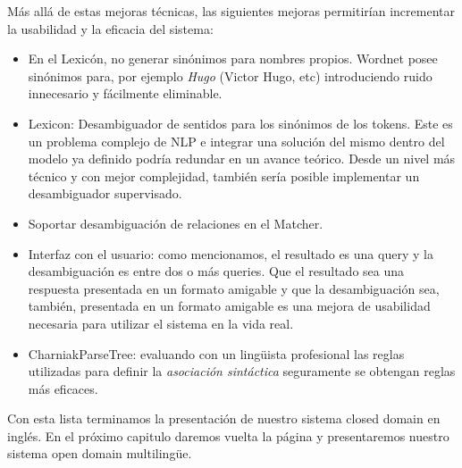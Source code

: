 Más allá de estas mejoras técnicas, las siguientes mejoras permitirían incrementar la usabilidad y la eficacia del sistema:

\begin{itemize}
\item En el Lexicón, no generar sinónimos para nombres propios. Wordnet posee sinónimos para, por ejemplo \textit{Hugo} (Victor Hugo, etc) introduciendo ruido innecesario y fácilmente eliminable.
\item Lexicon: Desambiguador de sentidos para los sinónimos de los tokens. Este es un problema complejo de NLP e integrar una solución del mismo dentro del modelo ya definido podría redundar en un avance teórico. Desde un nivel más técnico y con mejor complejidad, también sería posible implementar un desambiguador supervisado.
\item Soportar desambiguación de relaciones en el Matcher.
\item Interfaz con el usuario: como mencionamos, el resultado es una query y la desambiguación es entre dos o más queries. Que el resultado sea una respuesta presentada en un formato amigable y que la desambiguación sea, también, presentada en un formato amigable es una mejora de usabilidad necesaria para utilizar el sistema en la vida real.
\item CharniakParseTree: evaluando con un lingüista profesional las reglas utilizadas para definir la \textit{asociación sintáctica} seguramente se obtengan reglas más eficaces.
\end{itemize}

Con esta lista terminamos la presentación de nuestro sistema closed domain en inglés. En el próximo capitulo daremos vuelta la página y presentaremos nuestro sistema open domain multilingüe.


